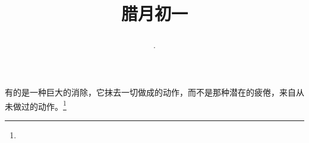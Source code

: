 \title{\date[d=31,m=12,y=2024][year:cn-y,年,month:cn,day:cn,日,·,weekday]·腊月初一 }
有的是一种巨大的消除，它抹去一切做成的动作，而不是那种潜在的疲倦，来自从未做过的动作。\footnote{ }

